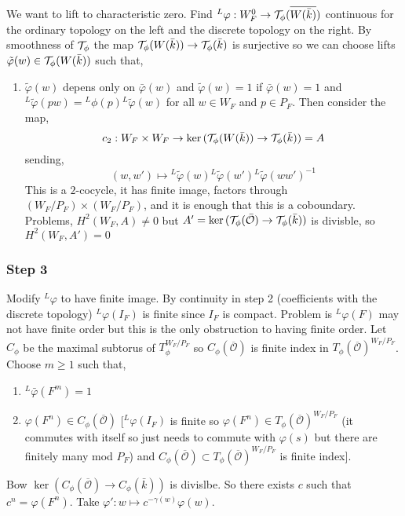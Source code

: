 \documentclass[12pt]{article}
\begin{document}
We want to lift to characteristic zero. Find ${}^L \varphi : W_F^0 \to \mathcal{T}_\phi(\overline{W(\bar{k})})$ continuous for the ordinary topology on the left and the discrete topology on the right. By smoothness of $\mathcal{T}_\phi$ the map $\mathcal{T}_\phi(W(\bar{k})) \to \mathcal{T}_\phi(\bar{k})$ is surjective so we can choose lifts $\tilde{\varphi}(w) \in \mathcal{T}_\phi(W(\bar{k}))$ such that,
\begin{enumerate}
\item $\tilde{\varphi}(w)$ depens only on $\bar{\varphi}(w)$ and $\tilde{\varphi}(w) = 1$ if $\bar{\varphi}(w) = 1$ and ${}^L \tilde{\varphi}(pw) = {}^L \phi(p) {}^L \tilde{\varphi}(w)$ for all $w \in W_F$ and $p \in P_F$. Then consider the map,
\[ c_2 : W_F \times W_F \to \ker{(\mathcal{T}_\phi(W(\bar{k})) \to \mathcal{T}_\phi(\bar{k}))} = A \]
sending,
\[ (w, w') \mapsto {}^L \tilde{\varphi}(w) {}^L \tilde{\varphi}(w') {}^L \tilde{\varphi}(ww')^{-1} \]
This is a $2$-cocycle, it has finite image, factors through $(W_F / P_F) \times (W_F / P_F)$, and it is enough that this is a coboundary. Problems, $H^2(W_F, A) \neq 0$ but $A' = \ker{(\mathcal{T}_\phi(\bar{\mathcal{O}}) \to \mathcal{T}_\phi(\bar{k}))}$ is divisble, so $H^2(W_F, A') = 0$ 
\end{enumerate}

\newcommand{\Obar}{\overline{\mathcal{O}}}

\subsubsection{Step 3}

Modify ${}^L \varphi$ to have finite image. By continuity in step 2 (coefficients with the discrete topology) ${}^L \varphi(I_F)$ is finite since $I_F$ is compact. Problem is ${}^L \varphi(F)$ may not have finite order but this is the only obstruction to having finite order. Let $C_\phi$ be the maximal subtorus of $T_\phi^{W_F / P_F}$ so $C_\phi(\Obar)$ is finite index in $T_\phi(\Obar)^{W_F / P_F}$. Choose $m \ge 1$ such that,
\begin{enumerate}
\item ${}^L \bar{\varphi}(F^m) = 1$
\item $\varphi(F^n) \in C_\phi(\Obar)$ [${}^L \varphi(I_F)$ is finite so $\varphi(F^n) \in T_\phi(\Obar)^{W_F/P_F}$ (it commutes with itself so just needs to commute with $\varphi(s)$ but there are finitely many mod $P_F$) and $C_\phi(\Obar) \subset T_\phi(\Obar)^{W_F/P_F}$ is finite index]. 
\end{enumerate}

Bow $\ker{(C_\phi(\Obar) \to C_\phi(\bar{k}))}$ is divislbe. So there exists $c$ such that $c^n = \varphi(F^n)$. Take $\varphi' : w \mapsto c^{-\gamma(w)} \varphi(w)$. 
\end{document}
